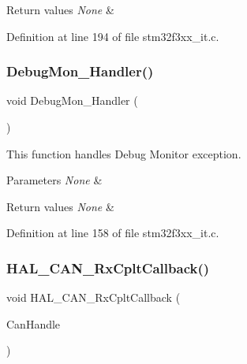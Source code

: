 \begin{DoxyRetVals}{Return values}
{\em None} & \\
\hline
\end{DoxyRetVals}


Definition at line 194 of file stm32f3xx\+\_\+it.\+c.

\mbox{\label{group___c_a_n___networking_gadbdfb05858cc36fc520974df37ec3cb0}} 
\subsubsection{Debug\+Mon\+\_\+\+Handler()}
{\footnotesize\ttfamily void Debug\+Mon\+\_\+\+Handler (\begin{DoxyParamCaption}\item[{void}]{ }\end{DoxyParamCaption})}



This function handles Debug Monitor exception. 


\begin{DoxyParams}{Parameters}
{\em None} & \\
\hline
\end{DoxyParams}

\begin{DoxyRetVals}{Return values}
{\em None} & \\
\hline
\end{DoxyRetVals}


Definition at line 158 of file stm32f3xx\+\_\+it.\+c.

\mbox{\label{group___c_a_n___networking_ga68d94b22db3d280c9915d5f49db08558}} 
\subsubsection{H\+A\+L\+\_\+\+C\+A\+N\+\_\+\+Rx\+Cplt\+Callback()}
{\footnotesize\ttfamily void H\+A\+L\+\_\+\+C\+A\+N\+\_\+\+Rx\+Cplt\+Callback (\begin{DoxyParamCaption}\item[{C\+A\+N\+\_\+\+Handle\+Type\+Def $\ast$}]{Can\+Handle }\end{DoxyParamCaption})}



